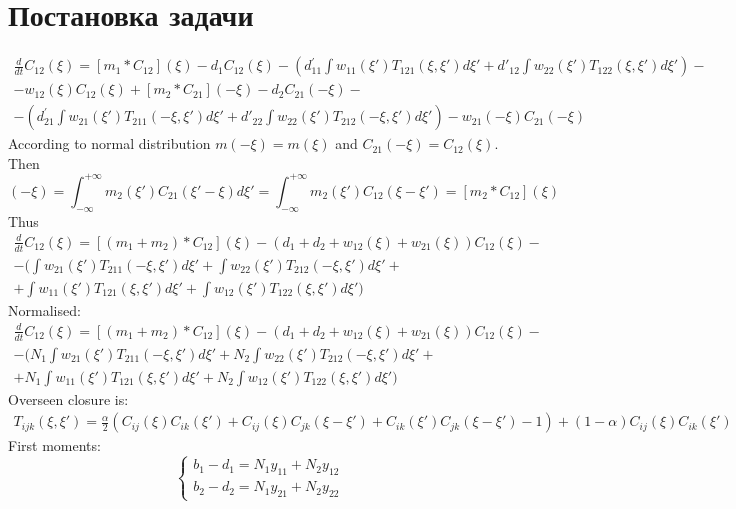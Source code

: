 \chapter{Постановка задачи}

\begin{multline}
\frac{d}{dt}C_{12}(\xi)=[m_{1}*C_{12}](\xi)-d_{1}C_{12}(\xi)-(d{}_{11}^{'}\int w_{11}(\xi')T_{121}(\xi,\xi')d\xi'+d'_{12}\int w_{22}(\xi')T_{122}(\xi,\xi')d\xi')-\\
-w_{12}(\xi)C_{12}(\xi)+[m_{2}*C_{21}](-\xi)-d_{2}C_{21}(-\xi)-\\
-(d_{21}^{'}\int w_{21}(\xi')T_{211}(-\xi,\xi')d\xi'+d'_{22}\int w_{22}(\xi')T_{212}(-\xi,\xi')d\xi')-w_{21}(-\xi)C_{21}(-\xi)
\end{multline}
According to normal distribution $ m(-\xi)=m(\xi) $ and $ C_{21}(-\xi)=C_{12}(\xi) $. Then 
\begin{equation*}
[m_{2}*C_{21}](-\xi)=\int_{-\infty}^{+\infty}m_{2}(\xi')C_{21}(\xi'-\xi)d\xi'=\int_{-\infty}^{+\infty}m_{2}(\xi')C_{12}(\xi-\xi')=[m_{2}*C_{12}](\xi)
\end{equation*}
Thus
\begin{multline*}
\frac{d}{dt}C_{12}(\xi)=[(m_{1}+m_{2})*C_{12}](\xi)-(d_{1}+d_{2}+w_{12}(\xi)+w_{21}(\xi))C_{12}(\xi)-\\
-(\int w_{21}(\xi')T_{211}(-\xi,\xi')d\xi'+\int w_{22}(\xi')T_{212}(-\xi,\xi')d\xi'+\\
+\int w_{11}(\xi')T_{121}(\xi,\xi')d\xi'+\int w_{12}(\xi')T_{122}(\xi,\xi')d\xi')
\end{multline*}
Normalised:
\begin{multline*}
\frac{d}{dt}C_{12}(\xi)=[(m_{1}+m_{2})*C_{12}](\xi)-(d_{1}+d_{2}+w_{12}(\xi)+w_{21}(\xi))C_{12}(\xi)-\\
-(N_{1}\int w_{21}(\xi')T_{211}(-\xi,\xi')d\xi'+N_{2}\int w_{22}(\xi')T_{212}(-\xi,\xi')d\xi'+\\
+N_{1}\int w_{11}(\xi')T_{121}(\xi,\xi')d\xi'+N_{2}\int w_{12}(\xi')T_{122}(\xi,\xi')d\xi')
\end{multline*}
Overseen closure is:
\begin{multline*}
T_{ijk}(\xi,\xi')=\frac{\alpha}{2}(C_{ij}(\xi)C_{ik}(\xi')+C_{ij}(\xi)C_{jk}(\xi-\xi')+C_{ik}(\xi')C_{jk}(\xi-\xi')-1)+(1-\alpha)C_{ij}(\xi)C_{ik}(\xi')
\end{multline*}
First moments:
\begin{equation*}
\begin{cases}
	b_{1}-d_{1}=N_{1}y_{11}+N_{2}y_{12}\\
	b_{2}-d_{2}=N_{1}y_{21}+N_{2}y_{22}
\end{cases}
\end{equation*}
